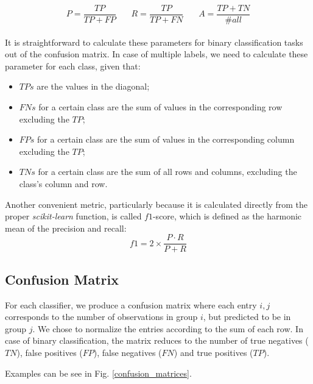 \documentclass{article}
\begin{document}
\begin{equation}
P = \frac{TP}{TP + FP} \ \ \ \ \ \ \ \  R = \frac{TP}{TP + FN} \ \ \ \ \ \ \ \  A = \frac{TP + TN}{\#all} \label{eq:model_training_parameters}
\end{equation}
\\

It is straightforward to calculate these parameters for binary classification tasks out of the confusion matrix. In case of multiple labels, we need to calculate these parameter for each class, given that:
\begin{itemize}
	\item  $TPs$ are the values in the diagonal; \
	\item  $FNs$ for a certain class are the sum of values in the corresponding row excluding the $TP$; \
	\item  $FPs$ for a certain class are the sum of values in the corresponding column excluding the $TP$; \
	\item  $TNs$ for a certain class are the sum of all rows and columns, excluding the class's column and row. \
\end{itemize}


Another convenient metric, particularly because it is calculated directly from the proper \textit{scikit-learn} function, is called $f1$-score, which is defined as the harmonic mean of the precision and recall:
\begin{equation}
f1 = 2 \times \frac{P \cdot R }{P + R }
\end{equation}


\subsection{Confusion Matrix}
For each classifier, we produce a confusion matrix where each entry $i,j$ corresponds to the number of observations in group $i$, but predicted to be in group $j$. We chose to normalize the entries according to the sum of each row.
In case of binary classification, the matrix reduces to the number of true negatives ($TN$), false positives ($FP$), false negatives ($FN$) and true positives ($TP$).

Examples can be see in Fig. \ref{confusion_matrices}.
\end{document}
